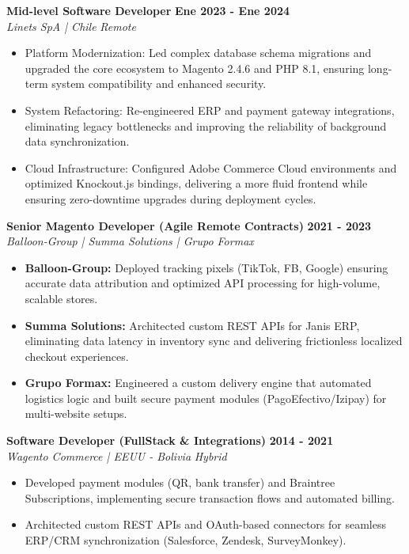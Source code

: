 \documentclass[11pt, a4paper]{article}
\newcommand{\jobtitle}[2]{\textbf{#1} \hfill \textbf{\small #2}} %
\newcommand{\company}[1]{\textit{#1}} %
\begin{document}
	\jobtitle{Mid-level Software Developer}{Ene 2023 - Ene 2024} \\
	\company{Linets SpA | Chile} \hfill \textit{Remote}
	\begin{itemize}[noitemsep, topsep=2pt]
		\item Platform Modernization: Led complex database schema migrations and upgraded the core ecosystem to Magento 2.4.6 and PHP 8.1, ensuring long-term system compatibility and enhanced security.
		\item System Refactoring: Re-engineered ERP and payment gateway integrations, eliminating legacy bottlenecks and improving the reliability of background data synchronization.
		\item Cloud Infrastructure: Configured Adobe Commerce Cloud environments and optimized Knockout.js bindings, delivering a more fluid frontend while ensuring zero-downtime upgrades during deployment cycles.
	\end{itemize}
	
	
	\jobtitle{Senior Magento Developer (Agile Remote Contracts)}{2021 - 2023} \\
	\company{Balloon-Group | Summa Solutions | Grupo Formax}
	\begin{itemize}[noitemsep, topsep=2pt]
		\item \textbf{Balloon-Group:} Deployed tracking pixels (TikTok, FB, Google) ensuring accurate data attribution and optimized API processing for high-volume, scalable stores.
		\item \textbf{Summa Solutions:} Architected custom REST APIs for Janis ERP, eliminating data latency in inventory sync and delivering frictionless localized checkout experiences.
		\item \textbf{Grupo Formax:} Engineered a custom delivery engine that automated logistics logic and built secure payment modules (PagoEfectivo/Izipay) for multi-website setups.
	\end{itemize}
	\jobtitle{Software Developer (FullStack \& Integrations)}{2014 - 2021} \\
	\company{Wagento Commerce | EEUU - Bolivia} \hfill \textit{Hybrid}
	\begin{itemize}[noitemsep, topsep=2pt]
		\item Developed payment modules (QR, bank transfer) and Braintree Subscriptions, implementing secure transaction flows and automated billing.
		\item Architected custom REST APIs and OAuth-based connectors for seamless ERP/CRM synchronization (Salesforce, Zendesk, SurveyMonkey).
	\end{itemize}
	
\end{document}
